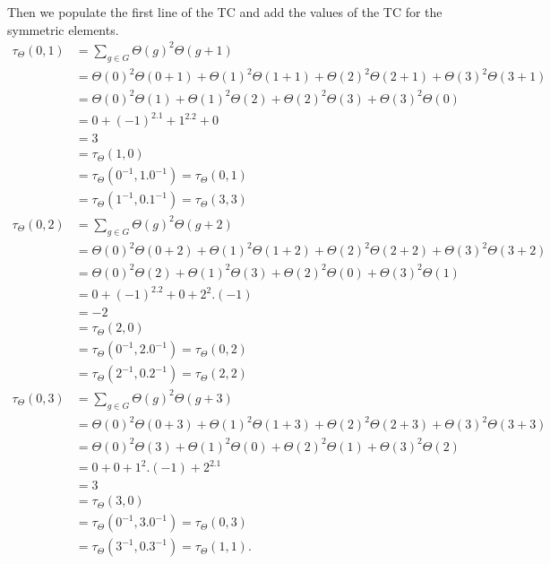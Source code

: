 \normalsize
Then we populate the first line of the TC and add the values of the TC for the symmetric elements.
\scriptsize
\begin{align*}
\tau_\Theta(0, 1)
    &= \sum_{g \in G} \Theta(g)^2 \Theta(g+1)\\
    &= \Theta(0)^2 \Theta(0+1)
    + \Theta(1)^2 \Theta(1+1)
    + \Theta(2)^2 \Theta(2+1)
    + \Theta(3)^2 \Theta(3+1) \\
    &= \Theta(0)^2 \Theta(1)
    + \Theta(1)^2 \Theta(2)
    + \Theta(2)^2 \Theta(3)
    + \Theta(3)^2 \Theta(0) \\
    &= 0 + (-1)^2.1 + 1^2.2+0\\
    &=3 \\
    &=\tau_\Theta(1, 0)\\
    &=\tau_\Theta(0^{-1}, 1.0^{-1}) = \tau_\Theta(0, 1) \\
    &=\tau_\Theta(1^{-1}, 0.1^{-1}) = \tau_\Theta(3, 3)\\
\tau_\Theta(0, 2)
    &= \sum_{g \in G} \Theta(g)^2 \Theta(g+2)\\
    &= \Theta(0)^2 \Theta(0+2)
    + \Theta(1)^2 \Theta(1+2)
    + \Theta(2)^2 \Theta(2+2)
    + \Theta(3)^2 \Theta(3+2) \\
    &= \Theta(0)^2 \Theta(2)
    + \Theta(1)^2 \Theta(3)
    + \Theta(2)^2 \Theta(0)
    + \Theta(3)^2 \Theta(1) \\
    &= 0 + (-1)^2.2 + 0 + 2^2.(-1)\\
    &= -2 \\
    &=\tau_\Theta(2, 0)\\
    &=\tau_\Theta(0^{-1}, 2.0^{-1}) = \tau_\Theta(0, 2) \\
    &=\tau_\Theta(2^{-1}, 0.2^{-1}) = \tau_\Theta(2, 2)\\
\tau_\Theta(0, 3)
    &= \sum_{g \in G} \Theta(g)^2 \Theta(g+3)\\
    &= \Theta(0)^2 \Theta(0+3)
    + \Theta(1)^2 \Theta(1+3)
    + \Theta(2)^2 \Theta(2+3)
    + \Theta(3)^2 \Theta(3+3) \\
    &= \Theta(0)^2 \Theta(3)
    + \Theta(1)^2 \Theta(0)
    + \Theta(2)^2 \Theta(1)
    + \Theta(3)^2 \Theta(2) \\
    &= 0 + 0 + 1^2.(-1) + 2^2.1\\
    &= 3 \\
    &=\tau_\Theta(3, 0)\\
    &=\tau_\Theta(0^{-1}, 3.0^{-1}) = \tau_\Theta(0, 3) \\
    &=\tau_\Theta(3^{-1}, 0.3^{-1}) = \tau_\Theta(1, 1).
\end{align*}

